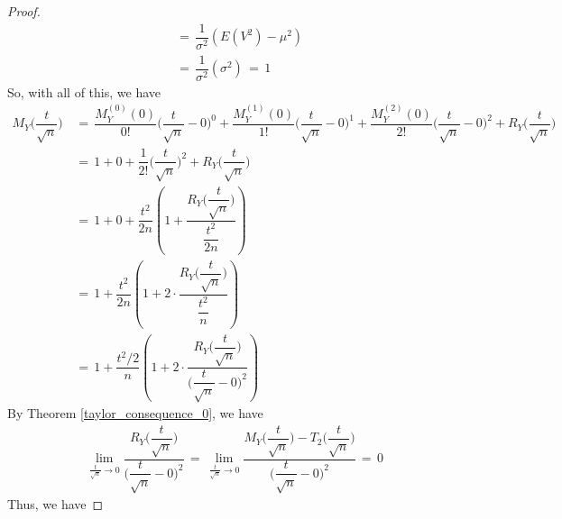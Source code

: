 \begin{theorem}
\begin{proof}
\begin{align*}
            &= \hspace{2pt} \dfrac{1}{\sigma^{2}} (E(V^{2}) - \mu^{2}) \\[1ex]
            &= \hspace{2pt} \dfrac{1}{\sigma^{2}} (\sigma^{2}) \hspace{2pt} = \hspace{2pt} 1
        \end{align*}
        So, with all of this, we have
        \begin{align*}
            M_{Y} \Big(\dfrac{t}{\sqrt{n}}\Big) \hspace{2pt} &= \hspace{2pt} \dfrac{M_{Y}^{(0)} (0)}{0!} \Big(\dfrac{t}{\sqrt{n}} - 0\Big)^{0} + \dfrac{M_{Y}^{(1)} (0)}{1!} \Big(\dfrac{t}{\sqrt{n}} - 0\Big)^{1} + \dfrac{M_{Y}^{(2)} (0)}{2!} \Big(\dfrac{t}{\sqrt{n}} - 0\Big)^{2} + R_{Y} \Big(\dfrac{t}{\sqrt{n}}\Big) \\[1ex]
            &= \hspace{2pt} 1 + 0 + \dfrac{1}{2!}\Big(\dfrac{t}{\sqrt{n}}\Big)^{2} + R_{Y}\Big(\dfrac{t}{\sqrt{n}}\Big) \\[1ex]
            &= \hspace{2pt} 1 + 0 + \dfrac{t^{2}}{2n} \left(1 + \dfrac{R_{Y} \Big(\dfrac{t}{\sqrt{n}}\Big)}{\dfrac{t^{2}}{2n}}\right) \\[1ex]
            &= \hspace{2pt} 1 + \dfrac{t^{2}}{2n} \left(1 + 2 \cdot \dfrac{R_{Y} \Big(\dfrac{t}{\sqrt{n}}\Big)}{\dfrac{t^{2}}{n}}\right) \\[1ex]
            &= \hspace{2pt} 1 + \dfrac{t^{2}/2}{n} \left(1 + 2 \cdot \dfrac{R_{Y} \Big(\dfrac{t}{\sqrt{n}}\Big)}{\Big(\dfrac{t}{\sqrt{n}} - 0\Big)^{2}}\right)
        \end{align*}
        By Theorem \ref{taylor_consequence_0}, we have
        \begin{align*}
            \lim_{\frac{t}{\sqrt{n}} \longrightarrow 0} \dfrac{R_{Y} \Big(\dfrac{t}{\sqrt{n}}\Big)}{\Big(\dfrac{t}{\sqrt{n}} - 0\Big)^{2}} \hspace{2pt} = \hspace{2pt} \lim_{\frac{t}{\sqrt{n}} \longrightarrow 0} \dfrac{M_{Y} \Big(\dfrac{t}{\sqrt{n}}\Big) - T_{2} \Big(\dfrac{t}{\sqrt{n}}\Big)}{\Big(\dfrac{t}{\sqrt{n}} - 0\Big)^{2}} \hspace{2pt} = \hspace{2pt} 0
        \end{align*}
        Thus, we have 

\end{proof}
\end{theorem}
